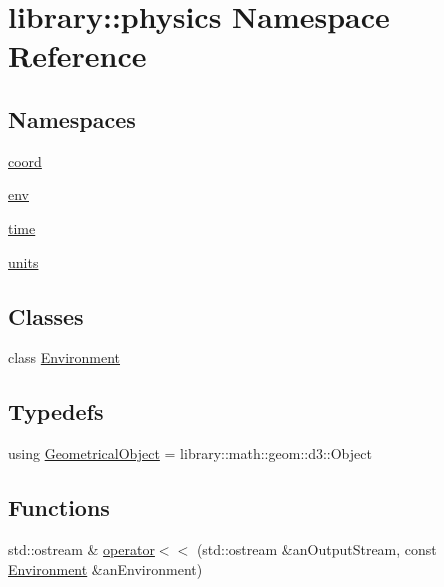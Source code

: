 \hypertarget{namespacelibrary_1_1physics}{}\section{library\+:\+:physics Namespace Reference}
\label{namespacelibrary_1_1physics}
\subsection*{Namespaces}
\begin{DoxyCompactItemize}
\item 
 \hyperlink{namespacelibrary_1_1physics_1_1coord}{coord}
\item 
 \hyperlink{namespacelibrary_1_1physics_1_1env}{env}
\item 
 \hyperlink{namespacelibrary_1_1physics_1_1time}{time}
\item 
 \hyperlink{namespacelibrary_1_1physics_1_1units}{units}
\end{DoxyCompactItemize}
\subsection*{Classes}
\begin{DoxyCompactItemize}
\item 
class \hyperlink{classlibrary_1_1physics_1_1_environment}{Environment}
\end{DoxyCompactItemize}
\subsection*{Typedefs}
\begin{DoxyCompactItemize}
\item 
using \hyperlink{namespacelibrary_1_1physics_a188a48c84b083aea628a2bd98f6b8e0a}{Geometrical\+Object} = library\+::math\+::geom\+::d3\+::\+Object
\end{DoxyCompactItemize}
\subsection*{Functions}
\begin{DoxyCompactItemize}
\item 
std\+::ostream \& \hyperlink{namespacelibrary_1_1physics_a3786f2dadc91182f9f027bf75bb186ce}{operator$<$$<$} (std\+::ostream \&an\+Output\+Stream, const \hyperlink{classlibrary_1_1physics_1_1_environment}{Environment} \&an\+Environment)
\end{DoxyCompactItemize}


